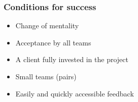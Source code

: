 \begin{frame}
    \frametitle{Conditions for success}
        \begin{block}
            \begin{itemize}
                \item Change of mentality
                \item Acceptance by all teams
                \item A client fully invested in the project
                \item Small teams (pairs)
                \item Easily and quickly accessible feedback
            \end{itemize}
        \end{block}
\end{frame}
